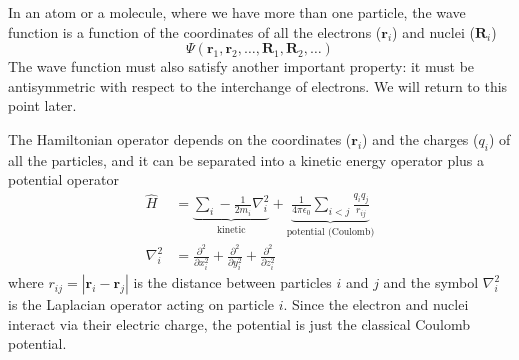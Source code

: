 \documentclass[../Main/chem371-notes.tex]{subfiles}
\begin{document}
In an atom or a molecule, where we have more than one particle, the wave function is a function of the coordinates of all the electrons ($\mathbf{r}_i$) and nuclei ($\mathbf{R}_i$)
\begin{equation}
\Psi(\mathbf{r}_1, \mathbf{r}_2, \ldots, \mathbf{R}_1,  \mathbf{R}_2,\ldots)
\end{equation}
The wave function must also satisfy another important property: it must be antisymmetric with respect to the interchange of electrons. We will return to this point later.

The Hamiltonian operator depends on the coordinates ($\mathbf{r}_i$) and the charges ($q_i$) of all the particles, and it can be separated into a kinetic energy operator plus a potential operator
\begin{align}
\hat{H} & =
\underbrace{
\sum_i -\frac{1}{2 m_i} \nabla^2_i
}_{\text{kinetic}}
+
\underbrace{
\frac{1}{4\pi \epsilon_0} \sum_{i < j} \frac{q_i q_j}{r_{ij}}
}_{\text{potential (Coulomb)}}  
\\
\nabla^2_i & = \frac{\partial^2}{\partial x_i^2} +  \frac{\partial^2}{\partial y_i^2} +  \frac{\partial^2}{\partial z_i^2}
\end{align}
where $r_{ij} = |\mathbf{r}_i - \mathbf{r}_j|$ is the distance between particles $i$ and $j$ and the symbol $\nabla^2_i$ is the Laplacian operator acting on particle $i$.
Since the electron and nuclei interact via their electric charge, the potential is just the classical Coulomb potential.

\end{document}
